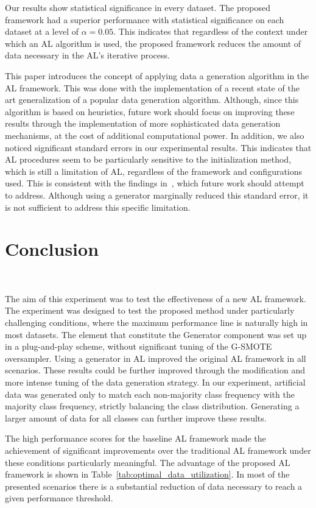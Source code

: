 \documentclass[preprint,12pt]{elsarticle}
\begin{document}
Our results show statistical significance in every dataset. The proposed
framework had a superior performance with statistical significance on each
dataset at a level of $\alpha = 0.05$. This indicates that regardless of the
context under which an AL algorithm is used, the proposed framework reduces
the amount of data necessary in the AL's iterative process.

This paper introduces the concept of applying data a generation algorithm in
the AL framework. This was done with the implementation of a recent state of
the art generalization of a popular data generation algorithm. Although, since
this algorithm is based on heuristics, future work should focus on improving
these results through the implementation of more sophisticated data generation
mechanisms, at the cost of additional computational power. In addition, we
also noticed significant standard errors in our experimental results. This
indicates that AL procedures seem to be particularly sensitive to the
initialization method, which is still a limitation of AL, regardless of the
framework and configurations used. This is consistent with the findings
in~\cite{Kottke2017}, which future work should attempt to address. Although
using a generator marginally reduced this standard error, it is not sufficient
to address this specific limitation.

\section{Conclusion}~\label{sec:conclusion}

The aim of this experiment was to test the effectiveness of a new AL
framework. The experiment was designed to test the proposed method under
particularly challenging conditions, where the maximum performance line is
naturally high in most datasets. The element that constitute the Generator
component was set up in a plug-and-play scheme, without significant tuning of
the G-SMOTE oversampler. Using a generator in AL improved the original AL
framework in all scenarios. These results could be further improved through
the modification and more intense tuning of the data generation strategy. In
our experiment, artificial data was generated only to match each non-majority
class frequency with the majority class frequency, strictly balancing the
class distribution. Generating a larger amount of data for all classes can
further improve these results. 

The high performance scores for the baseline AL framework made the achievement
of significant improvements over the traditional AL framework under these
conditions particularly meaningful. The advantage of the proposed AL framework
is shown in Table~\ref{tab:optimal_data_utilization}. In most of the presented
scenarios there is a substantial reduction of data necessary to reach a given
performance threshold. 
\end{document}
